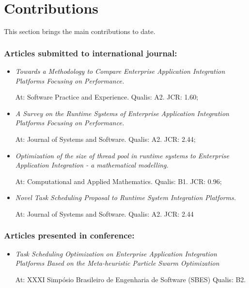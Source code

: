 \section{Contributions}
\label{sec:contributions}  
\noindent

This section brings the main contributions to date. 
     
\subsubsection*{Articles submitted to international journal:}

\begin{itemize}
\item \textit{Towards a Methodology to Compare Enterprise Application Integration Platforms Focusing on Performance.}

At: Software Practice and Experience. Qualis: A2. JCR: 1.60;
\item \textit{A Survey on the Runtime Systems of Enterprise Application Integration Platforms Focusing on Performance.}

At: Journal of Systems and Software. Qualis: A2. JCR: 2.44;
\item \textit{Optimization of the size of thread pool in runtime systems to Enterprise Application Integration - a mathematical modelling.}

At: Computational and Applied Mathematics. Qualis: B1. JCR: 0.96;
\item \textit{Novel Task Scheduling Proposal to Runtime System Integration Platforms.}

At: Journal of Systems and Software. Qualis: A2. JCR: 2.44
\end{itemize}

\subsubsection*{Articles presented in conference:}
\begin{itemize}
\item \textit{Task Scheduling Optimization on Enterprise Application Integration Platforms Based on the Meta-heuristic Particle Swarm Optimization}

At: XXXI Simpósio Brasileiro de Engenharia de Software (SBES) Qualis: B2.
\end{itemize}


